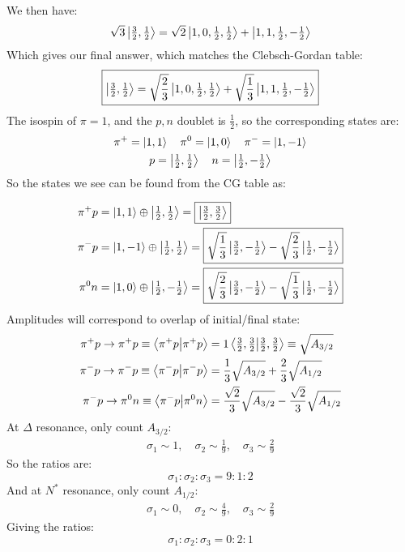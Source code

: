 \documentclass[12pt]{article}
\begin{document}
We then have:
\begin{align*}
  \sqrt{3}\ket{\tfrac32,\tfrac12}
  =\sqrt{2}\ket{1,0,\tfrac12,\tfrac12}+\ket{1,1,\tfrac12,-\tfrac12}
\end{align*}
Which gives our final answer, which matches the Clebsch-Gordan table:
\begin{equation}
  \label{eq:p2a}
  \boxed{\ket{\tfrac32,\tfrac12}
    =\sqrt{\frac23}\ket{1,0,\tfrac12,\tfrac12}
    +\sqrt{\frac13}\ket{1,1,\tfrac12,-\tfrac12}}
\end{equation}
The isospin of $\pi=1$, and the $p,n$ doublet is $\tfrac12$, so the corresponding states are:
\begin{gather*}
  \pi^+=\ket{1,1}\quad\pi^0=\ket{1,0}\quad\pi^-=\ket{1,-1}\\
  p=\ket{\tfrac12,\tfrac12}\quad n=\ket{\tfrac12,-\tfrac12}
\end{gather*}
So the states we see can be  found from the CG table as:

\begin{equation}
  \label{eq:p2b}
  \begin{aligned}
    \pi^+p&=\ket{1,1}\oplus\ket{\tfrac12,\tfrac12}
    =\boxed{\ket{\tfrac32,\tfrac32}}\\
    \pi^-p&=\ket{1,-1}\oplus\ket{\tfrac12,\tfrac12}
    =\boxed{
      \sqrt{\frac13}\ket{\tfrac32,-\tfrac12}-
      \sqrt{\frac23}\ket{\tfrac12,-\tfrac12}
    }\\
    \pi^0n&=\ket{1,0}\oplus\ket{\tfrac12,-\tfrac12}
    =\boxed{
      \sqrt{\frac23}\ket{\tfrac32,-\tfrac12}-
      \sqrt{\frac13}\ket{\tfrac12,-\tfrac12}
      }
  \end{aligned}
\end{equation}
Amplitudes will correspond to overlap of initial/final state:
\begin{align*}
  \pi^+p\to\pi^+p\equiv\ip{\pi^+p}&=1\ip{\tfrac32,\tfrac32}
  \equiv \sqrt{A_{3/2}}\\
  \pi^-p\to\pi^-p\equiv\ip{\pi^-p}&=
  \frac13\sqrt{A_{3/2}}+\frac23\sqrt{A_{1/2}}\\
  \pi^-p\to\pi^0n\equiv\ip{\pi^-p}{\pi^0n}&=
  \frac{\sqrt{2}}3\sqrt{A_{3/2}}-\frac{\sqrt{2}}3\sqrt{A_{1/2}}
\end{align*}
At $\Delta$ resonance, only count $A_{3/2}$:
\begin{align*}
  \sigma_1\sim 1,\quad \sigma_2\sim \frac19,\quad \sigma_3\sim\frac29
\end{align*}
So the ratios are:
\begin{equation}
  \label{eq:p2c1}
  \boxed{\sigma_1:\sigma_2:\sigma_3=9:1:2}
\end{equation}
And at $N^*$ resonance, only count $A_{1/2}$:
\begin{align*}
  \sigma_1\sim 0,\quad \sigma_2\sim \frac49,\quad \sigma_3\sim\frac29
\end{align*}
Giving the ratios:
\begin{equation}
  \label{eq:p2c2}
  \boxed{\sigma_1:\sigma_2:\sigma_3=0:2:1}
\end{equation}
\newpage
\end{document}
